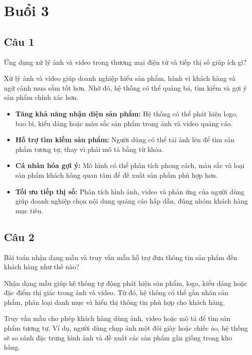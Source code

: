 \chapter{Buổi 3}
\label{Chapter3}
\setcounter{secnumdepth}{5}

\section*{Câu 1}
Ứng dụng xử lý ảnh và video trong thương mại điện tử và tiếp thị số giúp ích gì?

Xử lý ảnh và video giúp doanh nghiệp hiểu sản phẩm, hành vi khách hàng và ngữ cảnh mua sắm tốt hơn. Nhờ đó, hệ thống có thể quảng bá, tìm kiếm và gợi ý sản phẩm chính xác hơn.

\begin{itemize}
    \item \textbf{Tăng khả năng nhận diện sản phẩm:} Hệ thống có thể phát hiện logo, bao bì, kiểu dáng hoặc màu sắc sản phẩm trong ảnh và video quảng cáo.

    \item \textbf{Hỗ trợ tìm kiếm sản phẩm:} Người dùng có thể tải ảnh lên để tìm sản phẩm tương tự, thay vì phải mô tả bằng từ khóa.

    \item \textbf{Cá nhân hóa gợi ý:} Mô hình có thể phân tích phong cách, màu sắc và loại sản phẩm khách hàng quan tâm để đề xuất sản phẩm phù hợp hơn.

    \item \textbf{Tối ưu tiếp thị số:} Phân tích hình ảnh, video và phản ứng của người dùng giúp doanh nghiệp chọn nội dung quảng cáo hấp dẫn, đúng nhóm khách hàng mục tiêu.
\end{itemize}


\section*{Câu 2}
Bài toán nhận dạng mẫu và truy vấn mẫu hỗ trợ đưa thông tin sản phẩm đến khách hàng như thế nào?

Nhận dạng mẫu giúp hệ thống tự động phát hiện sản phẩm, logo, kiểu dáng hoặc đặc điểm thị giác trong ảnh và video. Từ đó, hệ thống có thể gắn nhãn sản phẩm, phân loại danh mục và hiển thị thông tin phù hợp cho khách hàng.

Truy vấn mẫu cho phép khách hàng dùng ảnh, video hoặc mô tả để tìm sản phẩm tương tự. Ví dụ, người dùng chụp ảnh một đôi giày hoặc chiếc áo, hệ thống sẽ so sánh đặc trưng hình ảnh và đề xuất các sản phẩm gần giống trong kho hàng.

